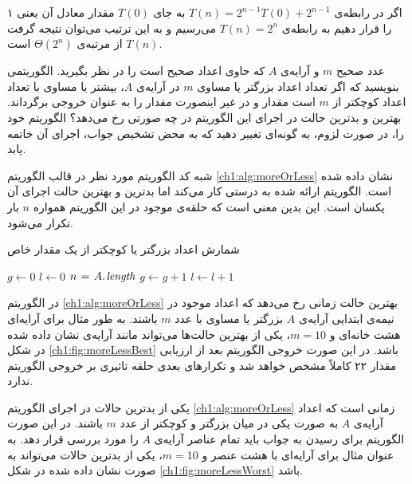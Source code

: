 {اگر در رابطه‌ی {$T(n)=2^{n-1}T(0) + 2^{n-1}$} به جای {$T(0)$} مقدار معادل آن یعنی ۱ را قرار دهیم به رابطه‌ی {$T(n)=2^{n}$} می‌رسیم و به این ترتیب می‌توان نتیجه گرفت {$T(n)$} از مرتبه‌ی {$\Theta (2^{n})$} است.



 عدد صحیح {$m$} و آرایه‌ی {$A$} که حاوی اعداد صحیح است را در نظر بگیرید. الگوریتمی بنویسید که اگر تعداد اعداد بزرگتر یا مساوی {$m$} در آرایه‌ی {$A$}، بیشتر یا مساوی با تعداد اعداد کوچکتر از {$m$} است مقدار {} و در غیر اینصورت مقدار {} را به عنوان خروجی برگرداند. بهترین و بدترین حالت در اجرای این الگوریتم در چه صورتی رخ می‌دهد؟ الگوریتم خود را، در صورت لزوم، به گونه‌ای تغییر دهید که به محض تشخیص جواب، اجرای آن خاتمه یابد.


شبه کد الگوریتم مورد نظر در قالب الگوریتم {\eqref{ch1:alg:moreOrLess}} نشان داده شده است. الگوریتم ارائه ‌شده به درستی کار می‌کند اما بدترین و بهترین حالت اجرای آن یکسان است. این بدین معنی است که حلقه‌ی موجود در این الگوریتم همواره {$n$} بار تکرار می‌شود. 

\begin{algorithm}
\caption{شمارش اعداد بزرگتر یا کوچکتر از یک مقدار خاص}\label{ch1:alg:moreOrLess}
\begin{latin}
\begin{algorithmic}[1]
	\State $g \gets 0$
	\State $l \gets 0$
	\State $n \mathrel{\hspace{1pt}=\hspace{1pt}} A.\hspace*{1pt}\mathit{length}$
					\State	$g \gets g+1$
			\Else
					\State $l \gets l+1$
			\EndIf
	\EndFor
			\State \Return {}
	\Else
			\State \Return {}
	\EndIf
\EndFunction
\end{algorithmic}
\end{latin}
\end{algorithm}

در الگوریتم {\eqref{ch1:alg:moreOrLess}} بهترین حالت زمانی رخ می‌دهد که اعداد موجود در نیمه‌ی ابتدایی آرایه‌ی {$A$} بزرگتر یا مساوی با عدد {$m$} باشند. به طور مثال برای آرایه‌ای هشت خانه‌ای و {$m=10$}، یکی از بهترین حالت‌ها می‌تواند مانند آرایه‌ی نشان داده شده در شکل {\eqref{ch1:fig:moreLessBest}} باشد. در این صورت خروجی الگوریتم بعد از ارزیابی مقدار ۲۲ کاملاً مشخص خواهد شد و تکرارهای بعدی حلقه تاثیری بر خروجی الگوریتم ندارد.

یکی از بدترین حالات در اجرای الگوریتم {\eqref{ch1:alg:moreOrLess}} زمانی است که اعداد آرایه‌ی {$A$} به صورت یکی در میان بزرگتر و کوچکتر از عدد {$m$} باشند. در این صورت الگوریتم برای رسیدن به جواب باید تمام عناصر آرایه‌ی {$A$} را مورد بررسی قرار دهد. به عنوان مثال برای آرایه‌ای با هشت عنصر و {$m=10$}، یکی از بدترین حالات می‌تواند به صورت نشان داده شده در شکل {\eqref{ch1:fig:moreLessWorst}} باشد.

}
